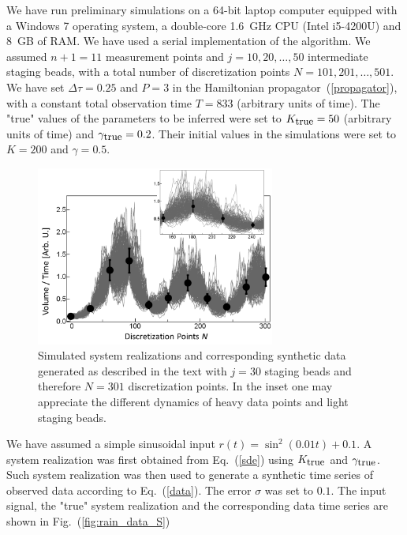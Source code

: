 \documentclass[12pt,a4paper,final]{iopart}
\begin{document}
We have run preliminary simulations on a 64-bit laptop computer equipped with a Windows 7 operating system, a double-core 1.6~GHz CPU (Intel i5-4200U) and 8~GB of RAM. We have used a serial implementation of the algorithm. We assumed $n+1 = 11$ measurement points and $j = 10, 20,\dots, 50$ intermediate staging beads, with a total number of discretization points $N = 101, 201, \dots, 501$. We have set $\Delta\tau = 0.25$ and $P = 3$ in the Hamiltonian propagator~(\ref{propagator}), with a constant total observation time $T = 833$ (arbitrary units of time). The "true" values of the parameters to be inferred were set to $K_{\mbox{\small true}}=50$ (arbitrary units of time) and $\gamma_{\mbox{\small true}} = 0.2$. Their initial values in the simulations were set to $K=200$ and $\gamma = 0.5$.
%
\begin{figure}[htb!]
    \centering
    \includegraphics[width=0.7\textwidth]{Figs/FigSpaghetti.png}
    \caption{Simulated system realizations and corresponding synthetic data generated as described in the text with $j=30$ staging beads and therefore $N=301$ discretization points. In the inset one may appreciate the different dynamics of heavy data points and light staging beads.}
    \label{fig:spaghetti}
\end{figure}

We have assumed a simple sinusoidal input $r(t) = \sin^2 \left( 0.01 t \right) + 0.1$. A system realization was first obtained from Eq.~(\ref{sde}) using $K_{\mbox{\small true}}$ and $\gamma_{\mbox{\small true}}$. Such system realization was then used to generate a synthetic time series of observed data according to Eq.~(\ref{data}). The error $\sigma$ was set to $0.1$. The input signal, the "true" system realization and the corresponding data time series are shown in Fig.~(\ref{fig:rain_data_S})
\end{document}
